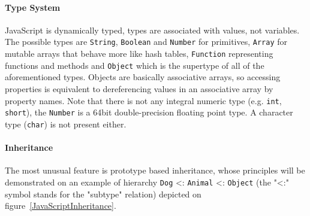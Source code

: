 \documentclass[12pt,a4paper]{report}
\begin{document}
\paragraph{Type System} JavaScript is dynamically typed, types are associated with values, not variables. The possible types are \texttt{String}, \texttt{Boolean} and \texttt{Number} for primitives, \texttt{Array} for mutable arrays that behave more like hash tables, \texttt{Function} representing functions and methods and \texttt{Object} which is the supertype of all of the aforementioned types. Objects are basically associative arrays, so accessing properties is equivalent to dereferencing values in an associative array by property names. Note that there is not any integral numeric type (e.g. \texttt{int}, \texttt{short}), the \texttt{Number} is a 64bit double-precision floating point type. A character type (\texttt{char}) is not present either.

\paragraph{Inheritance} The most unusual feature is prototype based inheritance, whose principles will be demonstrated on an example of hierarchy \texttt{Dog} \textless: \texttt{Animal} \textless: \texttt{Object} (the "\textless:" symbol stands for the "subtype" relation) depicted on figure~\ref{JavaScriptInheritance}. 
\end{document}
